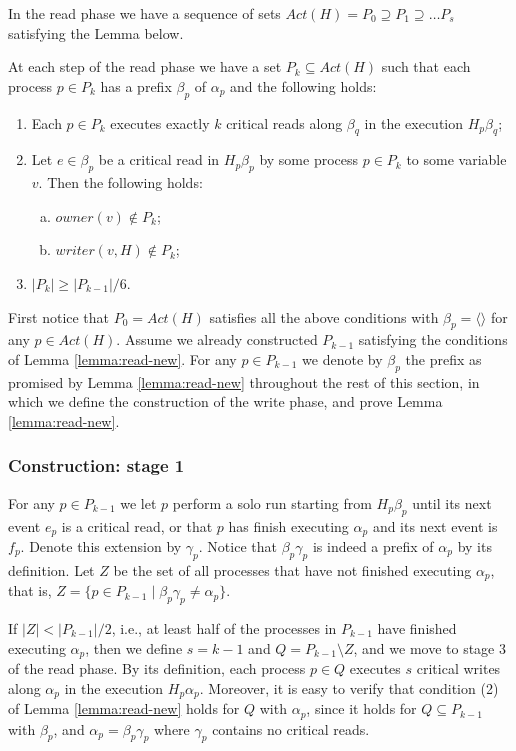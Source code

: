 In the read phase we have a sequence of sets $Act(H) = P_0 \supseteq P_1 \supseteq \ldots P_s$ satisfying the Lemma below.

\begin{lemma} \label{lemma:read-new}
	At each step of the read phase we have a set $P_k \subseteq Act(H)$ such that each process $p \in P_k$ has a prefix $\beta_p$ of $\alpha_p$ and the following holds:
	\begin{enumerate} [(1)]
		\item Each $p \in P_k$ executes exactly $k$ critical reads along $\beta_q$ in the execution $H_p \beta_q$;
		\item Let $e \in \beta_p$ be a critical read in $H_p \beta_p$ by some process $p \in P_k$ to some variable $v$. Then the following holds:
		\begin{enumerate}[(a)]
			\item $owner(v) \notin P_k$;
			\item $writer(v,H) \notin P_k$;
		\end{enumerate}
	\item $|P_k| \geq |P_{k-1}|/6$.
	\end{enumerate}
\end{lemma}

First notice that $P_0=Act(H)$ satisfies all the above conditions with $\beta_p=\langle \rangle$ for any $p \in Act(H)$. Assume we already constructed $P_{k-1}$ satisfying the conditions of Lemma \ref{lemma:read-new}. For any $p \in P_{k-1}$ we denote by $\beta_p$ the prefix as promised by Lemma \ref{lemma:read-new} throughout the rest of this section, in which we define the construction of the write phase, and prove Lemma \ref{lemma:read-new}.


\subsubsection{Construction: stage 1}
For any $p \in P_{k-1}$ we let $p$ perform a solo run starting from $H_p \beta_p$ until its next event $e_p$ is a critical read, or that $p$ has finish executing $\alpha_p$ and its next event is $f_p$. Denote this extension by $\gamma_p$. Notice that $\beta_p \gamma_p$ is indeed a prefix of $\alpha_p$ by its definition.
Let $Z$ be the set of all processes that have not finished executing $\alpha_p$, that is, $Z = \{p \in P_{k-1} \mid \beta_p \gamma_p \neq \alpha_p\}$.

If $|Z|<|P_{k-1}|/2$, i.e., at least half of the processes in $P_{k-1}$ have finished executing $\alpha_p$, then we define $s=k-1$ and $Q = P_{k-1} \setminus Z$, and we move to stage 3 of the read phase.
By its definition, each process $p \in Q$ executes $s$ critical writes along $\alpha_p$ in the execution $H_p \alpha_p$. Moreover, it is easy to verify that condition (2) of Lemma \ref{lemma:read-new} holds for $Q$ with $\alpha_p$, since it holds for $Q \subseteq P_{k-1}$ with $\beta_p$, and $\alpha_p = \beta_p \gamma_p$ where $\gamma_p$ contains no critical reads.

